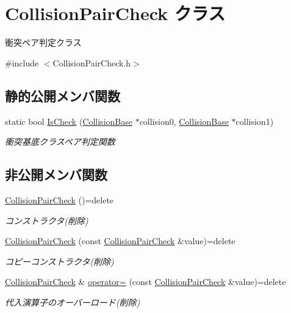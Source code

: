 \hypertarget{class_collision_pair_check}{}\section{Collision\+Pair\+Check クラス}
\label{class_collision_pair_check}


衝突ペア判定クラス  




{\ttfamily \#include $<$Collision\+Pair\+Check.\+h$>$}

\subsection*{静的公開メンバ関数}
\begin{DoxyCompactItemize}
\item 
static bool \mbox{\hyperlink{class_collision_pair_check_aa7603c32ae782ad890280d360ae19dfe}{Is\+Check}} (\mbox{\hyperlink{class_collision_base}{Collision\+Base}} $\ast$collision0, \mbox{\hyperlink{class_collision_base}{Collision\+Base}} $\ast$collision1)
\begin{DoxyCompactList}\small\item\em 衝突基底クラスペア判定関数 \end{DoxyCompactList}\end{DoxyCompactItemize}
\subsection*{非公開メンバ関数}
\begin{DoxyCompactItemize}
\item 
\mbox{\hyperlink{class_collision_pair_check_a1b4609489f79e7f272e97d15893339b5}{Collision\+Pair\+Check}} ()=delete
\begin{DoxyCompactList}\small\item\em コンストラクタ(削除) \end{DoxyCompactList}\item 
\mbox{\hyperlink{class_collision_pair_check_a61d81de67fb69218a54dd1224ef30eee}{Collision\+Pair\+Check}} (const \mbox{\hyperlink{class_collision_pair_check}{Collision\+Pair\+Check}} \&value)=delete
\begin{DoxyCompactList}\small\item\em コピーコンストラクタ(削除) \end{DoxyCompactList}\item 
\mbox{\hyperlink{class_collision_pair_check}{Collision\+Pair\+Check}} \& \mbox{\hyperlink{class_collision_pair_check_a32ebe7303801a6bfa9225c60ddb4b749}{operator=}} (const \mbox{\hyperlink{class_collision_pair_check}{Collision\+Pair\+Check}} \&value)=delete
\begin{DoxyCompactList}\small\item\em 代入演算子のオーバーロード(削除) \end{DoxyCompactList}\end{DoxyCompactItemize}

